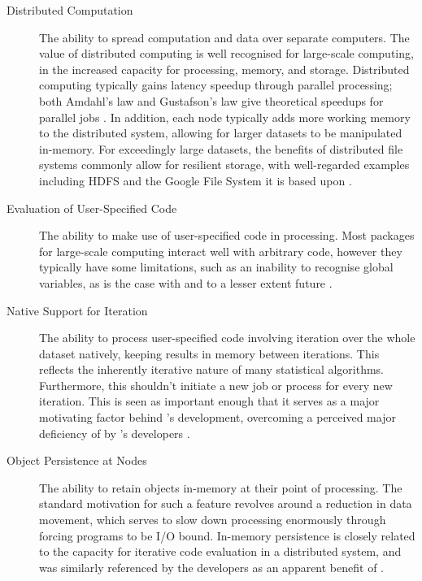 \begin{description}
  \item[Distributed Computation]
    The ability to spread computation and data over separate computers. The
    value of distributed computing is well recognised for large-scale
    computing, in the increased capacity for processing, memory, and
    storage. Distributed computing typically gains latency speedup through
    parallel processing; both Amdahl's law and Gustafson's law give
    theoretical speedups for parallel jobs \cites{amdahl1967law,gustafson1988law}. In addition, each node typically adds more working
    memory to the distributed system, allowing for larger datasets to be
    manipulated in-memory. For exceedingly large datasets, the benefits of
    distributed file systems commonly allow for resilient storage, with
    well-regarded examples including HDFS and the Google File System it is
    based upon \cites{shvachko2010hadoop,ghemawat2003google}.
  \item[Evaluation of User-Specified Code]
    The ability to make use of user-specified code in processing. Most \R{}
    packages for large-scale computing interact well with arbitrary code,
    however they typically have some limitations, such as an inability to
    recognise global variables, as is the case with  and to a lesser
    extent future \cites{sparklyr2020limitations,microsoft20}.
  \item[Native Support for Iteration]
    The ability to process user-specified code involving iteration over the
    whole dataset natively, keeping results in memory between iterations.
    This reflects the inherently iterative nature of many statistical
    algorithms. Furthermore, this shouldn't initiate a new job or process
    for every new iteration. This is seen as important enough that it serves
    as a major motivating factor behind 's development, overcoming a
    perceived major deficiency of  by 's developers
    \cite{zaharia2010spark}.
  \item[Object Persistence at Nodes]
    The ability to retain objects in-memory at their point of processing.
    The standard motivation for such a feature revolves around a reduction
    in data movement, which serves to slow down processing enormously
    through forcing programs to be I/O bound. In-memory persistence is
    closely related to the capacity for iterative code evaluation in a
    distributed system, and was similarly referenced by the  developers
    as an apparent benefit of \cite{zaharia2010spark}.

\end{description}
